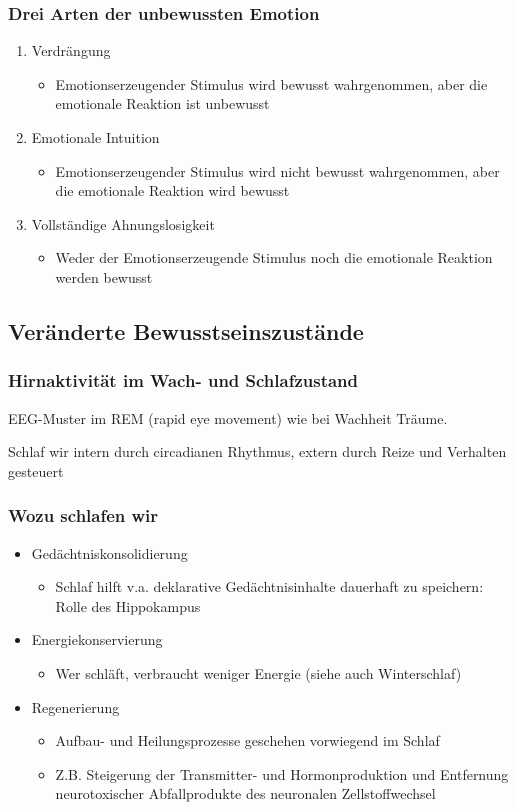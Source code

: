 \subsubsection{Drei Arten der unbewussten Emotion}
\begin{enumerate}
	\item Verdrängung
		\begin{itemize}
			\item Emotionserzeugender Stimulus wird bewusst wahrgenommen, aber die emotionale Reaktion ist unbewusst
		\end{itemize}
	\item Emotionale Intuition
		\begin{itemize}
			\item Emotionserzeugender Stimulus wird nicht bewusst wahrgenommen, aber die emotionale Reaktion wird bewusst
		\end{itemize}
	\item Vollständige Ahnungslosigkeit
		\begin{itemize}
			\item Weder der Emotionserzeugende Stimulus noch die emotionale Reaktion werden bewusst
		\end{itemize}
\end{enumerate}
\subsection{Veränderte Bewusstseinszustände}
\subsubsection{Hirnaktivität im Wach- und Schlafzustand}
EEG-Muster im REM (rapid eye movement) wie bei Wachheit \rightarrow Träume.

Schlaf wir intern durch circadianen Rhythmus, extern durch Reize und Verhalten gesteuert
\subsubsection{Wozu schlafen wir}
\begin{itemize}
	\item Gedächtniskonsolidierung
		\begin{itemize}
			\item Schlaf hilft v.a. deklarative Gedächtnisinhalte
					dauerhaft zu speichern: Rolle des Hippokampus
		\end{itemize}
	\item Energiekonservierung
		\begin{itemize}
			\item Wer schläft, verbraucht weniger Energie (siehe auch Winterschlaf)
		\end{itemize}
	\item Regenerierung
		\begin{itemize}
			\item Aufbau- und Heilungsprozesse geschehen vorwiegend im Schlaf
			\item Z.B. Steigerung der Transmitter- und Hormonproduktion und Entfernung neurotoxischer Abfallprodukte des neuronalen Zellstoffwechsel
		\end{itemize}
\end{itemize}
